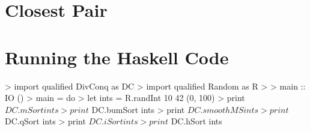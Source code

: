 \section{Closest Pair}

\section{Running the Haskell Code}

\begin{haskellcode}

> import qualified DivConq as DC
> import qualified Random as R
> 
> main :: IO ()
> main = do
>   let ints = R.randInt 10 42 (0, 100)
>   print $ DC.mSort ints
>   print $ DC.bumSort ints
>   print $ DC.smoothMS ints
>   print $ DC.qSort ints
>   print $ DC.iSort ints
>   print $ DC.hSort ints

\end{haskellcode}
